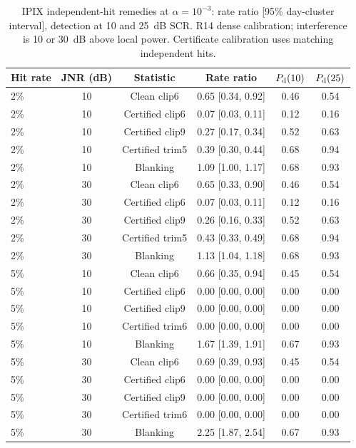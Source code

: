 \documentclass[10pt]{article}
\begin{document}
\begin{table}[htbp]
\centering\small\setlength{\tabcolsep}{4pt}
\caption{IPIX independent-hit remedies at $\alpha=10^{-3}$: rate ratio [95\% day-cluster interval], detection at 10 and 25~dB SCR. R14 dense calibration; interference is 10 or 30~dB above local power. Certificate calibration uses matching independent hits.}\label{tab:remedies_3}
\begin{tabular}{lccccc}
\toprule
Hit rate & JNR (dB) & Statistic & Rate ratio & $P_{\rm d}(10)$ & $P_{\rm d}(25)$ \\
\midrule
2\% & 10 & Clean clip6 & 0.65 [0.34, 0.92] & 0.46 & 0.54 \\
2\% & 10 & Certified clip6 & 0.07 [0.03, 0.11] & 0.12 & 0.16 \\
2\% & 10 & Certified clip9 & 0.27 [0.17, 0.34] & 0.52 & 0.63 \\
2\% & 10 & Certified trim5 & 0.39 [0.30, 0.44] & 0.68 & 0.94 \\
2\% & 10 & Blanking & 1.09 [1.00, 1.17] & 0.68 & 0.93 \\
2\% & 30 & Clean clip6 & 0.65 [0.33, 0.90] & 0.46 & 0.54 \\
2\% & 30 & Certified clip6 & 0.07 [0.03, 0.11] & 0.12 & 0.16 \\
2\% & 30 & Certified clip9 & 0.26 [0.16, 0.33] & 0.52 & 0.63 \\
2\% & 30 & Certified trim5 & 0.43 [0.33, 0.49] & 0.68 & 0.94 \\
2\% & 30 & Blanking & 1.13 [1.04, 1.18] & 0.68 & 0.93 \\
5\% & 10 & Clean clip6 & 0.66 [0.35, 0.94] & 0.45 & 0.54 \\
5\% & 10 & Certified clip6 & 0.00 [0.00, 0.00] & 0.00 & 0.00 \\
5\% & 10 & Certified clip9 & 0.00 [0.00, 0.00] & 0.00 & 0.00 \\
5\% & 10 & Certified trim6 & 0.00 [0.00, 0.00] & 0.00 & 0.00 \\
5\% & 10 & Blanking & 1.67 [1.39, 1.91] & 0.67 & 0.93 \\
5\% & 30 & Clean clip6 & 0.69 [0.39, 0.93] & 0.45 & 0.54 \\
5\% & 30 & Certified clip6 & 0.00 [0.00, 0.00] & 0.00 & 0.00 \\
5\% & 30 & Certified clip9 & 0.00 [0.00, 0.00] & 0.00 & 0.00 \\
5\% & 30 & Certified trim6 & 0.00 [0.00, 0.00] & 0.00 & 0.00 \\
5\% & 30 & Blanking & 2.25 [1.87, 2.54] & 0.67 & 0.93 \\
\bottomrule
\end{tabular}
\end{table}
\end{document}
